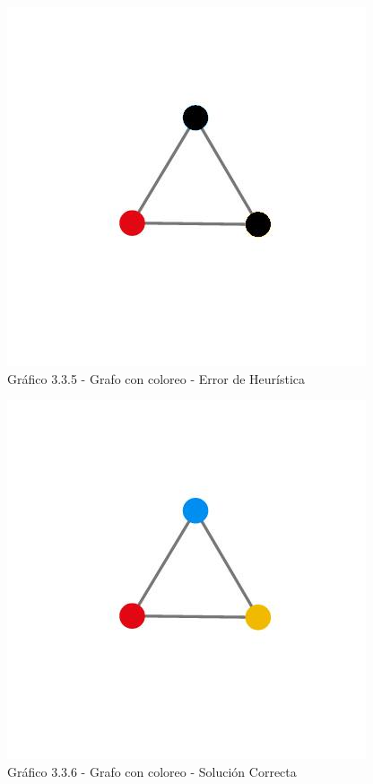 \vspace*{0.3cm} \vspace*{0.3cm}
  \begin{center}
 \includegraphics[scale=0.5]{./ej3/parte3/grafo2color.jpg}
 	{\\Gráfico 3.3.5 - Grafo con coloreo - Error de Heurística}
  \end{center}
  \vspace*{0.3cm}

  \vspace*{0.3cm} \vspace*{0.3cm}
  \begin{center}
 \includegraphics[scale=0.5]{./ej3/parte3/grafo2color2.jpg}
 	{\\Gráfico 3.3.6 - Grafo con coloreo - Solución Correcta}
  \end{center}
  \vspace*{0.3cm}
   
